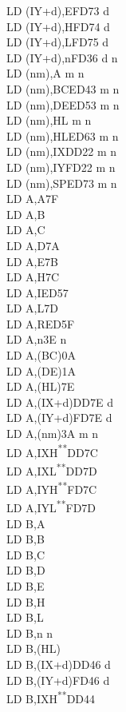 \documentclass[12pt,twoside,openright,a4paper]{book}
\newcommand{\UNDOC}{\textnormal{\textsuperscript{**}}}
\begin{document}
\begin{multicols}{3}
{\begin{tabbing}
		LD (IY+d),E\>FD73 d\\
		LD (IY+d),H\>FD74 d\\
		LD (IY+d),L\>FD75 d\\
		LD (IY+d),n\>FD36 d n\\
		LD (nm),A m n\\
		LD (nm),BC\>ED43 m n\\
		LD (nm),DE\>ED53 m n\\
		LD (nm),HL m n\\
		LD (nm),HL\>ED63 m n\\
		LD (nm),IX\>DD22 m n\\
		LD (nm),IY\>FD22 m n\\
		LD (nm),SP\>ED73 m n\\
		LD A,A\>7F\\
		LD A,B\\
		LD A,C\\
		LD A,D\>7A\\
		LD A,E\>7B\\
		LD A,H\>7C\\
		LD A,I\>ED57\\
		LD A,L\>7D\\
		LD A,R\>ED5F\\
		LD A,n\>3E n\\
		LD A,(BC)\>0A\\
		LD A,(DE)\>1A\\
		LD A,(HL)\>7E\\
		LD A,(IX+d)\>DD7E d\\
		LD A,(IY+d)\>FD7E d\\
		LD A,(nm)\>3A m n\\
		LD A,IXH\UNDOC\>DD7C\\
		LD A,IXL\UNDOC\>DD7D\\
		LD A,IYH\UNDOC\>FD7C\\
		LD A,IYL\UNDOC\>FD7D\\
		LD B,A\\
		LD B,B\\
		LD B,C\\
		LD B,D\\
		LD B,E\\
		LD B,H\\
		LD B,L\\
		LD B,n n\\
		LD B,(HL)\\
		LD B,(IX+d)\>DD46 d\\
		LD B,(IY+d)\>FD46 d\\
		LD B,IXH\UNDOC\>DD44\\

\end{tabbing}}
\end{multicols}
\end{document}
